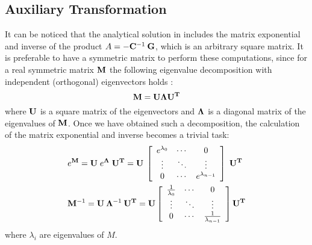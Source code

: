 \subsection{Auxiliary Transformation} \label{sec:ce-auxiliary}
It can be noticed that the analytical solution in  includes the matrix exponential and inverse of the product \mbox{$A = - \mathbf{\mathbf{C}}^{-1} \: \mathbf{\mathbf{G}}$}, which is an arbitrary square matrix. It is preferable to have a symmetric matrix to perform these computations, since for a real symmetric matrix $\mathbf{M}$ the following eigenvalue decomposition with independent (orthogonal) eigenvectors holds \cite{press2007}:
\begin{equation} \label{eq:eigenvalue-decomposition}
  \mathbf{M} = \mathbf{\mathbf{U}} \mathbf{\Lambda} \mathbf{\mathbf{U}}^{\mathbf{T}}
\end{equation}
where $\mathbf{\mathbf{U}}$ is a square matrix of the eigenvectors and $\mathbf{\Lambda}$ is a diagonal matrix of the eigenvalues of $\mathbf{M}$. Once we have obtained such a decomposition, the calculation of the matrix exponential and inverse becomes a trivial task:
\begin{align*}
  & e^{\mathbf{M}} = \mathbf{\mathbf{U}} \; e^{\mathbf{\Lambda}} \; \mathbf{\mathbf{U}}^{\mathbf{T}} = \mathbf{\mathbf{U}}\: \left[
      \begin{array}{ccc}
        e^{\lambda_0} & \cdots & 0 \\
        \vdots & \ddots & \vdots \\
        0 & \cdots & e^{\lambda_{n - 1}}
      \end{array}
    \right] \; \mathbf{\mathbf{U}}^{\mathbf{T}} \\
  & \mathbf{M}^{-1} = \mathbf{\mathbf{U}} \: \mathbf{\Lambda}^{-1} \: \mathbf{\mathbf{U}}^{\mathbf{T}} = \mathbf{\mathbf{U}} \left[
      \begin{array}{ccc}
        \frac{1}{\lambda_0} & \cdots & 0 \\
        \vdots & \ddots & \vdots \\
        0 & \cdots & \frac{1}{\lambda_{n - 1}}
      \end{array}
    \right] \mathbf{\mathbf{U}}^{\mathbf{T}} \\
\end{align*}
where $\lambda_i$ are eigenvalues of $M$.

